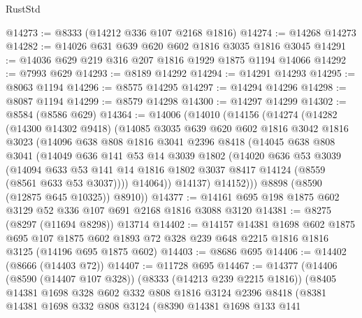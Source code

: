\begin{lexlean}{RustStd}
\begin{coremodule}
@14273 := @8333 (@14212 @336 @107 @2168 @1816)
@14274 := @14268 @14273
@14282 := @14026 @631 @639 @620 @602 @1816 @3035 @1816 @3045
@14291 := @14036 @629 @219 @316 @207 @1816 @1929 @1875 @1194 @14066
@14292 := @7993 @629
@14293 := @8189 @14292
@14294 := @14291 @14293
@14295 := @8063 @1194
@14296 := @8575 @14295
@14297 := @14294 @14296
@14298 := @8087 @1194
@14299 := @8579 @14298
@14300 := @14297 @14299
@14302 := @8584 (@8586 @629)
@14364 := @14006
    (@14010
      (@14156
        (@14274
          (@14282
            (@14300 @14302 @9418)
            (@14085
              @3035
              @639
              @620
              @602
              @1816
              @3042
              @1816
              @3023
              (@14096
                @638
                @808
                @1816
                @3041
                @2396
                @8418
                (@14045
                  @638
                  @808
                  @3041
                  (@14049
                    @636
                    @141
                    @53
                    @14
                    @3039
                    @1802
                    (@14020
                      @636
                      @53
                      @3039
                      (@14094
                        @633
                        @53
                        @141
                        @14
                        @1816
                        @1802
                        @3037
                        @8417
                        @14124
                        (@8559 (@8561 @633 @53 @3037))))
                    @14064))
                @14137)
              @14152)))
        @8898
        (@8590 (@12875 @645 @10325))
        @8910))
@14377 := @14161 @695 @198 @1875 @602 @3129 @52 @336 @107 @691 @2168 @1816 @3088 @3120
@14381 := @8275 (@8297 (@11694 @8298)) @13714
@14402 := @14157
    @14381
    @1698
    @602
    @1875
    @695
    @107
    @1875
    @602
    @1893
    @72
    @328
    @239
    @648
    @2215
    @1816
    @1816
    @3125
    (@14196 @695 @1875 @602)
@14403 := @8686 @695
@14406 := @14402 (@8666 (@14403 @72))
@14407 := @11728 @695
@14467 := @14377
    (@14406
      (@8590 (@14407 @107 @328))
      (@8333 (@14213 @239 @2215 @1816))
      (@8405
        @14381
        @1698
        @328
        @602
        @332
        @808
        @1816
        @3124
        @2396
        @8418
        (@8381
          @14381
          @1698
          @332
          @808
          @3124
          (@8390
            @14381
            @1698
            @133
            @141

\end{coremodule}
\end{lexlean}
